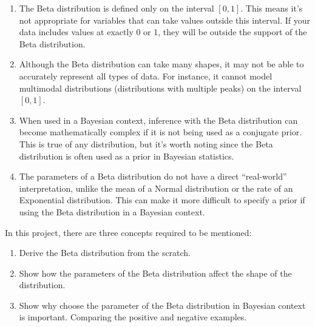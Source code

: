 \documentclass{article}
\theoremstyle{definition}
\theoremstyle{remark}
\begin{document}
\begin{enumerate}
    \item The Beta distribution is defined only on the interval $[0, 1]$. This means it's not appropriate for variables that can take values outside this interval. If your data includes values at exactly 0 or 1, they will be outside the support of the Beta distribution.
    \item Although the Beta distribution can take many shapes, it may not be able to accurately represent all types of data. For instance, it cannot model multimodal distributions (distributions with multiple peaks) on the interval $[0, 1]$.
    \item When used in a Bayesian context, inference with the Beta distribution can become mathematically complex if it is not being used as a conjugate prior. This is true of any distribution, but it's worth noting since the Beta distribution is often used as a prior in Bayesian statistics.
    \item The parameters of a Beta distribution do not have a direct ``real-world'' interpretation, unlike the mean of a Normal distribution or the rate of an Exponential distribution. This can make it more difficult to specify a prior if using the Beta distribution in a Bayesian context.
\end{enumerate}

In this project, there are three concepts required to be mentioned:
\begin{enumerate}
    \item Derive the Beta distribution from the scratch.
    \item Show how the parameters of the Beta distribution affect the shape of the distribution.
    \item Show why choose the parameter of the Beta distribution in Bayesian context is important. Comparing the positive and negative examples.
\end{enumerate}
\end{document}
